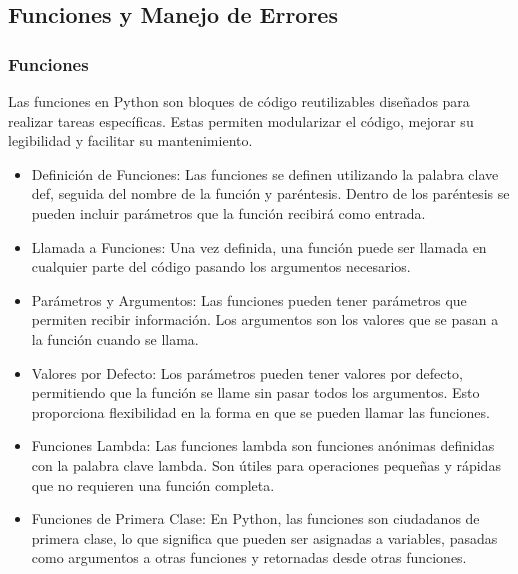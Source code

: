 \documentclass[10pt,a4paper]{article}
\begin{document}
\subsection{Funciones y Manejo de Errores}
\subsubsection{Funciones}
Las funciones en Python son bloques de código reutilizables diseñados para realizar tareas específicas. Estas permiten modularizar el código, mejorar su legibilidad y facilitar su mantenimiento.
\begin{itemize}
 

   \item Definición de Funciones: Las funciones se definen utilizando la palabra clave def, seguida del nombre de la función y paréntesis. Dentro de los paréntesis se pueden incluir parámetros que la función recibirá como entrada.

   \item Llamada a Funciones: Una vez definida, una función puede ser llamada en cualquier parte del código pasando los argumentos necesarios.

   \item Parámetros y Argumentos: Las funciones pueden tener parámetros que permiten recibir información. Los argumentos son los valores que se pasan a la función cuando se llama.

   \item Valores por Defecto: Los parámetros pueden tener valores por defecto, permitiendo que la función se llame sin pasar todos los argumentos. Esto proporciona flexibilidad en la forma en que se pueden llamar las funciones.

   \item Funciones Lambda: Las funciones lambda son funciones anónimas definidas con la palabra clave lambda. Son útiles para operaciones pequeñas y rápidas que no requieren una función completa.

   \item Funciones de Primera Clase: En Python, las funciones son ciudadanos de primera clase, lo que significa que pueden ser asignadas a variables, pasadas como argumentos a otras funciones y retornadas desde otras funciones.
\end{itemize}
\end{document}
